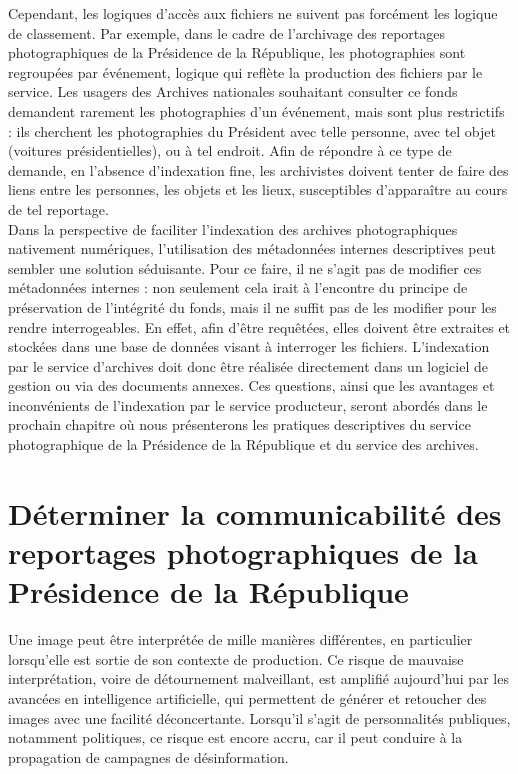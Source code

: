 Cependant, les logiques d'accès aux fichiers ne suivent pas forcément les logique de classement. Par exemple, dans le cadre de l'archivage des reportages photographiques de la Présidence de la République, les photographies sont regroupées par événement, logique qui reflète la production des fichiers par le service. Les usagers des Archives nationales souhaitant consulter ce fonds demandent rarement les photographies d'un événement, mais sont plus restrictifs : ils cherchent les photographies du Président avec telle personne, avec tel objet (voitures présidentielles), ou à tel endroit. Afin de répondre à ce type de demande, en l'absence d'indexation fine, les archivistes doivent tenter de faire des liens entre les personnes, les objets et les lieux, susceptibles d'apparaître au cours de tel reportage.
\\

Dans la perspective de faciliter l'indexation des archives photographiques nativement numériques, l'utilisation des métadonnées internes descriptives peut sembler une solution séduisante. Pour ce faire, il ne s'agit pas de modifier ces métadonnées internes : non seulement cela irait à l'encontre du principe de préservation de l'intégrité du fonds, mais il ne suffit pas de les modifier pour les rendre interrogeables. En effet, afin d'être requêtées, elles doivent être extraites et stockées dans une base de données visant à interroger les fichiers. L’indexation par le service d’archives doit donc être réalisée directement dans un logiciel de gestion ou via des documents annexes. Ces questions, ainsi que les avantages et inconvénients de l'indexation par le service producteur, seront abordés dans le prochain chapitre où nous présenterons les pratiques descriptives du service photographique de la Présidence de la République et du service des archives.

\section{Déterminer la communicabilité des reportages photographiques de la Présidence de la République}

Une image peut être interprétée de mille manières différentes, en particulier lorsqu’elle est sortie de son contexte de production. Ce risque de mauvaise interprétation, voire de détournement malveillant, est amplifié aujourd'hui par les avancées en intelligence artificielle, qui permettent de générer et retoucher des images avec une facilité déconcertante. Lorsqu'il s'agit de personnalités publiques, notamment politiques, ce risque est encore accru, car il peut conduire à la propagation de campagnes de désinformation.

